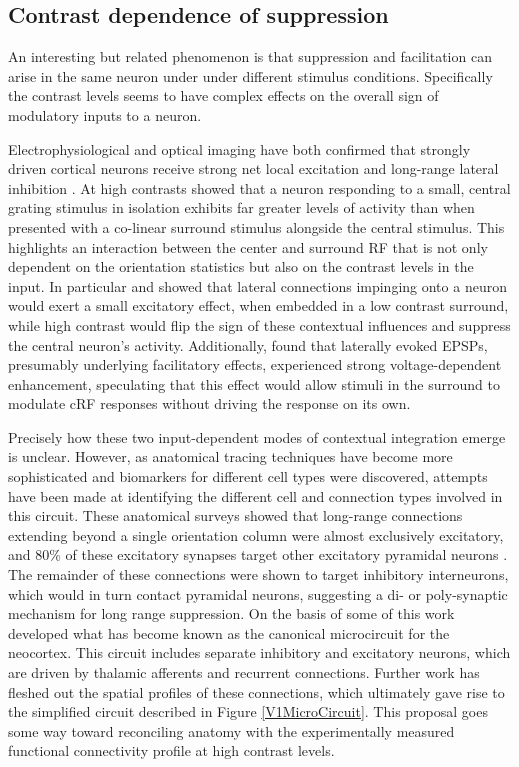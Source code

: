 \subsection{Contrast dependence of suppression}

An interesting but related phenomenon is that suppression and
facilitation can arise in the same neuron under under different
stimulus conditions. Specifically the contrast levels seems to have
complex effects on the overall sign of modulatory inputs to a neuron.

Electrophysiological and optical imaging have both confirmed that
strongly driven cortical neurons receive strong net local excitation and
long-range lateral inhibition \citep{Grinvald1994,Sceniak2001}. At
high contrasts \cite{Grinvald1994} showed that a neuron responding to
a small, central grating stimulus in isolation exhibits far greater
levels of activity than when presented with a co-linear surround
stimulus alongside the central stimulus. This highlights an
interaction between the center and surround RF that is not only
dependent on the orientation statistics but also on the contrast
levels in the input. In particular \cite{Hirsch1991} and
\cite{Weliky1995} showed that lateral connections impinging onto a
neuron would exert a small excitatory effect, when embedded in a low
contrast surround, while high contrast would flip the sign of these
contextual influences and suppress the central neuron's
activity. Additionally, \cite{Hirsch1991} found that laterally evoked
EPSPs, presumably underlying facilitatory effects, experienced strong
voltage-dependent enhancement, speculating that this effect would allow
stimuli in the surround to modulate cRF responses without driving the
response on its own.

Precisely how these two input-dependent modes of contextual
integration emerge is unclear. However, as anatomical tracing
techniques have become more sophisticated and biomarkers for different
cell types were discovered, attempts have been made at identifying the 
different cell and connection types involved in this circuit. These
anatomical surveys showed that long-range 
connections extending beyond a single orientation column were almost
exclusively excitatory, and 80\% of these excitatory synapses target
other excitatory pyramidal neurons
\citep{Hirsch1991,Kisvarday1997a}. The remainder of these connections
were shown to target inhibitory interneurons, which would in turn
contact pyramidal neurons, suggesting a di- or poly-synaptic mechanism
for long range suppression. On the basis of some of this work
\cite{Douglas1991} developed what has become known as the canonical
microcircuit for the neocortex. This circuit includes separate
inhibitory and excitatory neurons, which are driven by thalamic
afferents and recurrent connections. Further work has fleshed out the
spatial profiles of these connections, which ultimately gave rise to
the simplified circuit described in Figure \ref{V1MicroCircuit}. This
proposal goes some way toward reconciling anatomy with the experimentally
measured functional connectivity profile at high contrast levels.

